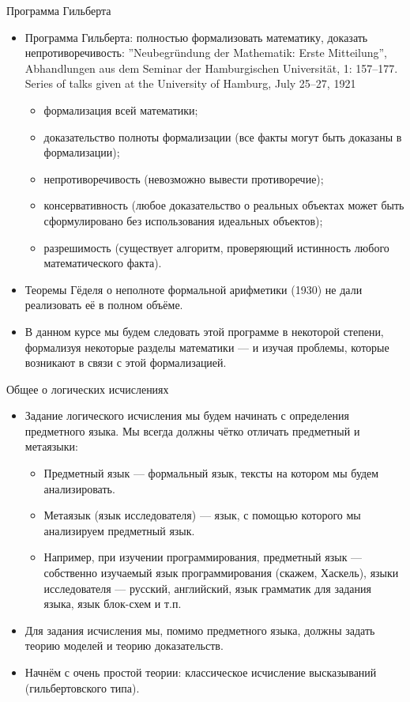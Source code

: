 \documentclass[aspectratio=169]{beamer}
\begin{document}
\begin{frame}{Программа Гильберта}
\begin{itemize}
\item Программа Гильберта: полностью формализовать математику, доказать непротиворечивость:
”Neubegründung der Mathematik: Erste Mitteilung”, Abhandlungen aus dem Seminar der Hamburgischen Universität, 1: 157–177. Series of talks given at the University of Hamburg, July 25–27, 1921

\begin{itemize}
\item формализация всей математики;
\item доказательство полноты формализации (все факты могут быть доказаны в формализации);
\item непротиворечивость (невозможно вывести противоречие);
\item консервативность (любое доказательство о реальных объектах может быть сформулировано без использования идеальных объектов);
\item разрешимость (существует алгоритм, проверяющий истинность любого математического факта).
\end{itemize}

\item Теоремы Гёделя о неполноте формальной арифметики (1930) не дали реализовать её в полном объёме.
\item В данном курсе мы будем следовать этой программе в некоторой степени, 
формализуя некоторые разделы математики --- и изучая проблемы, которые возникают в связи с этой формализацией.
\end{itemize}
\end{frame}

\begin{frame}{Общее о логических исчислениях}
\begin{itemize}
\item Задание логического исчисления мы будем начинать с определения предметного языка. 
Мы всегда должны чётко отличать предметный и метаязыки:
\begin{itemize}
\item Предметный язык --- формальный язык, тексты на котором мы будем анализировать.
\item Метаязык (язык исследователя) --- язык, с помощью которого мы анализируем предметный язык.
\item Например, при изучении программирования, предметный язык --- собственно изучаемый язык
программирования (скажем, Хаскель), языки исследователя --- русский, английский, язык грамматик
для задания языка, язык блок-схем и т.п.
\end{itemize}
\item Для задания исчисления мы, помимо предметного языка, должны задать теорию моделей и теорию доказательств.
\item Начнём с очень простой теории: классическое исчисление высказываний (гильбертовского типа).
\end{itemize}
\end{frame}
\end{document}
